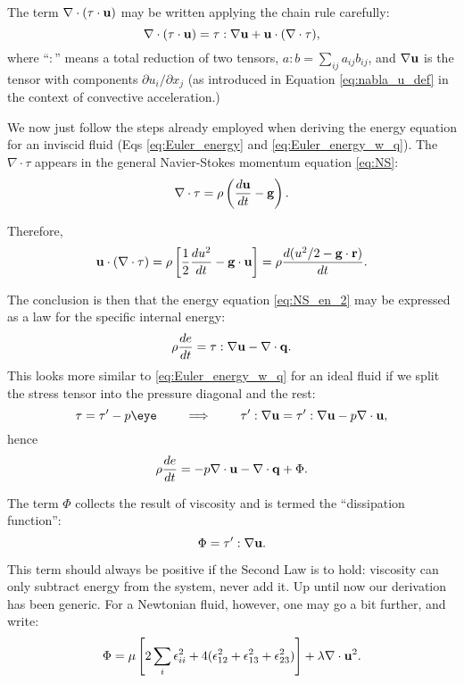 The term $\nabla\cdot ( \tau \cdot \mathbf{u} )$ may be written applying the
chain rule carefully:
\begin{equation}
  \nabla\cdot ( \tau \cdot  \mathbf{u} ) =
  \tau : \nabla\mathbf{u} + \mathbf{u}\cdot(\nabla\cdot\tau) ,
\label{eq:nabla_tau_u}
\end{equation}
where ``$:$'' means a total reduction of two tensors,
$a:b=\sum_{ij} a_{ij} b_{ij} $, and $\nabla\mathbf{u}$ is the tensor with
components $\partial u_i/\partial x_j$ (as introduced in Equation
\ref{eq:nabla_u_def} in the context of convective acceleration.)

We now just follow the steps already employed when deriving the energy
equation for an inviscid fluid (Eqs \ref{eq:Euler_energy} and
\ref{eq:Euler_energy_w_q}).  The $\nabla\cdot\tau$ appears in the
general Navier-Stokes momentum equation \ref{eq:NS}:
\[
  \nabla \cdot \tau =
  \rho \left( \frac{d\mathbf{u} }{dt}    - \mathbf{g} \right) .
\]

Therefore,
\[
\mathbf{u}\cdot(\nabla\cdot\tau) =
 \rho \left[
 \frac12 
  \frac{d u^2 }{dt}    - \mathbf{g}\cdot\mathbf{u}
  \right] =
   \rho
  \frac{d (u^2 /2 - \mathbf{g}\cdot\mathbf{r} ) }{dt}    .
\]

The conclusion is then that the energy equation \ref{eq:NS_en_2} may be
expressed as a law for the specific internal energy:
\[
\rho \frac{d e }{dt}  = 
  \tau : \nabla\mathbf{u} - \nabla\cdot\mathbf{q} .
\]
This looks more similar to \ref{eq:Euler_energy_w_q} for an ideal
fluid if we split the stress tensor into the pressure diagonal and the
rest:
\[
\tau = \tau' - p \eye \qquad \implies \qquad
 \tau' : \nabla\bfu = \tau' : \nabla\bfu - p \divu ,
\]
hence
\[
\rho \frac{d e }{dt}  =  - p \nabla\cdot\mathbf{u} - \nabla\cdot\mathbf{q}  + \Phi .
\]

The term $\Phi$ collects the result of viscosity and is termed
the ``dissipation function'':
\[
\Phi = \tau' : \nabla\mathbf{u} .
\]

This term should always be positive if the Second Law is to hold:
viscosity can only subtract energy from the system, never add it.
Up until now our derivation has been generic. For a Newtonian fluid,
however, one may go a bit further, and write:
\begin{equation}
  \Phi = \mu
  \left[
    2 \sum_i \epsilon_{ii}^2 +
    4  (\epsilon_{12}^2 + \epsilon_{13}^2 + \epsilon_{23}^2 )
  \right]+
  \lambda \nabla\cdot\mathbf{u}^2 .\label{eq:Phi_Newtonian}
\end{equation}


